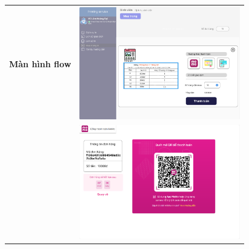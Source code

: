 \documentclass[a4paper]{article}
\begin{document}
\newpage
\begin{table}[h!]
\centering
\begin{tabular}{|c|c|}
\hline
\textbf{Màn hình flow} & \includegraphics[width=7cm]{picture/pic5-5.png} \\ & \includegraphics[width=7cm]{picture/pic6-6.png}\\
\hline
\end{tabular}
\end{table}
\end{document}
